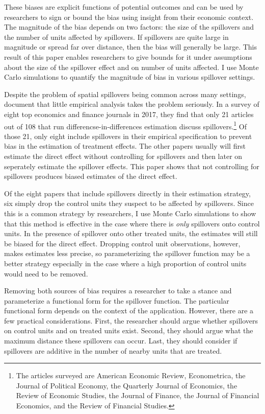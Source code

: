 \documentclass[11pt]{article}
\begin{document}
These biases are explicit functions of potential outcomes and can be used by researchers to sign or bound the bias using insight from their economic context. The magnitude of the bias depends on two factors: the size of the spillovers and the number of units affected by spillovers. If spillovers are quite large in magnitude or spread far over distance, then the bias will generally be large. This result of this paper enables researchers to give bounds for it under assumptions about the size of the spillover effect and on number of units affected. I use Monte Carlo simulations to quantify the magnitude of bias in various spillover settings.

Despite the problem of spatial spillovers being common across many settings, \citet{Berg_Streitz_2019} document that little empirical analysis takes the problem seriously. In a survey of eight top economics and finance journals in 2017, they find that only 21 articles out of 108 that run differencse-in-differences estimation discuss spillovers.\footnote{The articles surveyed are American Economic Review, Econometrica, the Journal of Political Economy, the Quarterly Journal of Economics, the Review of Economic Studies, the Journal of Finance, the Journal of Financial Economics, and the Review of Financial Studies.} Of those 21, only eight include spillovers in their empirical specification to prevent bias in the estimation of treatment effects. The other papers usually will first estimate the direct effect without controlling for spillovers and then later on seperately estimate the spillover effects. This paper shows that not controlling for spillovers produces biased estimates of the direct effect.

Of the eight papers that include spillovers directly in their estimation strategy, six simply drop the control units they suspect to be affected by spillovers. Since this is a common strategy by researchers, I use Monte Carlo simulations to show that this method is effective in the case where there is \textit{only} spillovers onto control units. In the presence of spillover onto other treated units, the estimates will still be biased for the direct effect. Dropping control unit observations, however, makes estimates less precise, so parameterizing the spillover function may be a better strategy especially in the case where a high proportion of control units would need to be removed.

Removing both sources of bias requires a researcher to take a stance and parameterize a functional form for the spillover function. The particular functional form depends on the context of the application. However, there are a few practical considerations. First, the researcher should argue whether spillovers on control units and on treated units exist. Second, they should argue what the maximum distance these spillovers can occur. Last, they should consider if spillovers are additive in the number of nearby units that are treated. 
\end{document}
